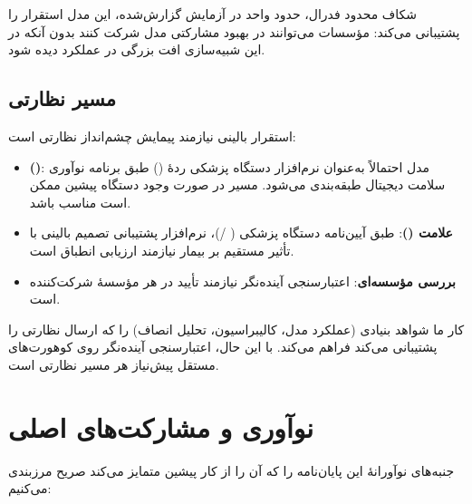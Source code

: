 شکاف محدود فدرال، حدود  واحد  در آزمایش گزارش‌شده، این مدل استقرار را پشتیبانی می‌کند: مؤسسات می‌توانند در بهبود مشارکتی مدل شرکت کنند بدون آنکه در این شبیه‌سازی افت بزرگی در عملکرد دیده شود.

\subsection{مسیر نظارتی}

استقرار بالینی نیازمند پیمایش چشم‌انداز نظارتی است:
\begin{itemize}
\item \textbf{ ()}: مدل احتمالاً به‌عنوان نرم‌افزار دستگاه پزشکی ردۀ  () طبق برنامه نوآوری سلامت دیجیتال  طبقه‌بندی می‌شود. مسیر  در صورت وجود دستگاه پیشین ممکن است مناسب باشد.
\item \textbf{علامت  ()}: طبق آیین‌نامه دستگاه پزشکی  ( /)، نرم‌افزار پشتیبانی تصمیم بالینی با تأثیر مستقیم بر بیمار نیازمند ارزیابی انطباق است.
\item \textbf{بررسی مؤسسه‌ای}: اعتبارسنجی آینده‌نگر نیازمند تأیید  در هر مؤسسۀ شرکت‌کننده است.
\end{itemize}

کار ما شواهد بنیادی (عملکرد مدل، کالیبراسیون، تحلیل انصاف) را که ارسال نظارتی را پشتیبانی می‌کند فراهم می‌کند. با این حال، اعتبارسنجی آینده‌نگر روی کوهورت‌های مستقل پیش‌نیاز هر مسیر نظارتی است.

\section{نوآوری و مشارکت‌های اصلی}

جنبه‌های نوآورانۀ این پایان‌نامه را که آن را از کار پیشین متمایز می‌کند صریح مرزبندی می‌کنیم:


